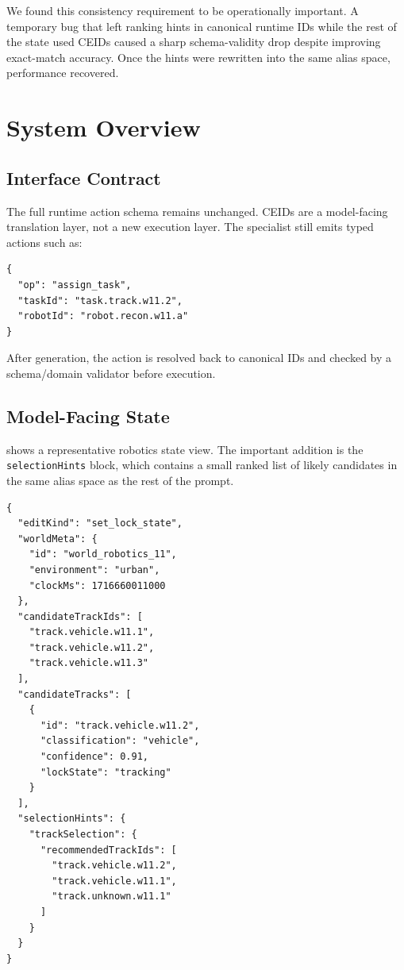 \documentclass[11pt]{article}
\begin{document}
We found this consistency requirement to be operationally important. A temporary bug that left ranking hints in canonical runtime IDs while the rest of the state used CEIDs caused a sharp schema-validity drop despite improving exact-match accuracy. Once the hints were rewritten into the same alias space, performance recovered.

\section{System Overview}
\subsection{Interface Contract}
The full runtime action schema remains unchanged. CEIDs are a model-facing translation layer, not a new execution layer. The specialist still emits typed actions such as:

\begin{listing}[t]
\caption{Representative coordination edit target.}
\label{lst:coordination-edit}
\begin{verbatim}
{
  "op": "assign_task",
  "taskId": "task.track.w11.2",
  "robotId": "robot.recon.w11.a"
}
\end{verbatim}
\end{listing}

After generation, the action is resolved back to canonical IDs and checked by a schema/domain validator before execution.



\subsection{Model-Facing State}
 shows a representative robotics state view. The important addition is the \texttt{selectionHints} block, which contains a small ranked list of likely candidates in the same alias space as the rest of the prompt.

\begin{listing}[t]
\caption{Representative robotics state view with canonical entity IDs and ranking hints.}
\label{lst:robotics-state-schema}
\begin{verbatim}
{
  "editKind": "set_lock_state",
  "worldMeta": {
    "id": "world_robotics_11",
    "environment": "urban",
    "clockMs": 1716660011000
  },
  "candidateTrackIds": [
    "track.vehicle.w11.1",
    "track.vehicle.w11.2",
    "track.vehicle.w11.3"
  ],
  "candidateTracks": [
    {
      "id": "track.vehicle.w11.2",
      "classification": "vehicle",
      "confidence": 0.91,
      "lockState": "tracking"
    }
  ],
  "selectionHints": {
    "trackSelection": {
      "recommendedTrackIds": [
        "track.vehicle.w11.2",
        "track.vehicle.w11.1",
        "track.unknown.w11.1"
      ]
    }
  }
}
\end{verbatim}
\end{listing}
\end{document}

